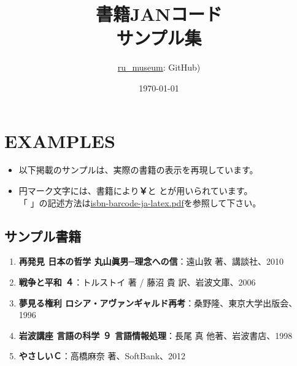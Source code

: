\documentclass[a5j,tombo,10pt,titlepage,pdfusetitle]{ltjsbook}
\title{{\Huge 書籍JANコード}\\ \lbrack サンプル集 \rbrack\vspace{60mm}}
\author{\href{https://github.com/ru-museum?tab=repositories}{ru\_museum}: GitHub)}
\date{\today}
\def\colH#1{\color[HTML]{#1}}
\def\fs#1#2{\fontsize{#1}{#2}\selectfont }
\begin{document}
\thispagestyle{empty}

\maketitle

\setcounter{tocdepth}{2}
\clearpage
\thispagestyle{empty}
\tableofcontents
\newpage
\thispagestyle{empty}

\section{EXAMPLES}   
\begin{itemize}
  \item 以下掲載のサンプルは、実際の書籍の表示を再現しています。
  \item 円マーク文字には、書籍により{\colH{800000}\bfseries￥}と{\colH{800000} }とが用いられています。\\
  「{\colH{800000} }」の記述方法は\href{https://github.com/ru-museum/isbn-barcode-ja-latex/isbn-barcode-ja-latex.pdf}{isbn-barcode-ja-latex.pdf}を参照して下さい。
\end{itemize}

\subsection*{サンプル書籍}   



    
\begin{enumerate}\fs{9}{14}
  \item \textbf{再発見 日本の哲学 丸山眞男─理念への信}：遠山敦 著、講談社、2010
  \item \textbf{戦争と平和 ４}：トルストイ 著 / 藤沼 貴 訳、岩波文庫、2006 
  \item \textbf{夢見る権利 ロシア・アヴァンギャルド再考}：桑野隆、東京大学出版会、1996 
  \item \textbf{岩波講座 言語の科学 ９ 言語情報処理}：長尾 真 他著、岩波書店、1998 
  \item \textbf{やさしいＣ}：高橋麻奈 著、SoftBank、2012 
\end{enumerate}
\end{document}
